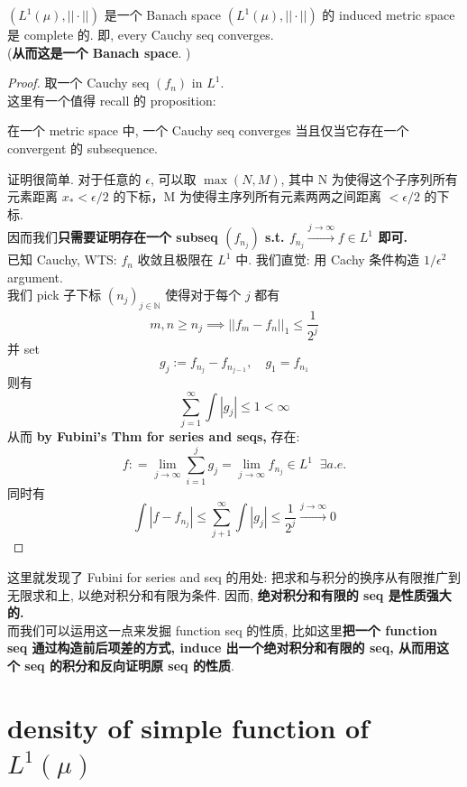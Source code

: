 \documentclass[lang=cn,11pt]{elegantbook}
\begin{document}
\begin{corollary}{$(L^1(\mu), ||\cdot||)$ 是一个 Banach space}
    $(L^1(\mu), ||\cdot||)$ 的 induced metric space 是 complete 的. 即, every Cauchy seq converges.\\
    (\textbf{从而这是一个 Banach space}. )
\end{corollary}
\begin{proof}
    取一个 Cauchy seq $(f_n) $ in $L^1$.\\
这里有一个值得 recall 的 proposition: \begin{proposition}
在一个 metric space 中, 一个 Cauchy seq converges 当且仅当它存在一个 convergent 的 subsequence.
\end{proposition}
证明很简单. 对于任意的 $\epsilon$, 可以取 $\max(N,M)$, 其中 N 为使得这个子序列所有元素距离 $x_* < \epsilon / 2$ 的下标，M 为使得主序列所有元素两两之间距离 $< \epsilon / 2$ 的下标. \\
因而我们\textbf{只需要证明存在一个 subseq $(f_{n_j}) $ s.t. $f_{n_j} \overset{j\to \infty}{\longrightarrow} f \in L^1$ 即可.}\\
已知 Cauchy, WTS: $f_n$ 收敛且极限在 $L^1$ 中. 我们直觉: 用 Cachy 条件构造 $1/\epsilon^2$ argument. \\
我们 pick 子下标 $(n_j)_{j\in \mathbb{N}}$ 使得对于每个 $j$ 都有 \[
m,n \geq n_j \implies       ||f_m - f_n||_1 \leq \frac{1}{2^j}
\]
并 set \[
g_j := f_{n_j} - f_{n_{j-1}}, \quad g_1 = f_{n_1}
\]则有 \[
\sum_{j=1}^\infty \int |g_j| \leq 1 < \infty
\]
从而 \textbf{by Fubini's Thm for series and seqs,} 存在: 
\[
f: = \lim_{j \to \infty} \sum_{i=1}^j g_j = \lim_{j \to \infty} f_{n_j}  \in L^1 \;\; \exists a.e.
\]
同时有 \[
\int |f - f_{n_j} | \leq \sum_{j+1}^\infty  \int |g_j|  \leq \frac{1}{2^j} \overset{j\to \infty}{\longrightarrow} 0
\]
\end{proof}
\begin{remark}
这里就发现了 Fubini for series and seq 的用处: 把求和与积分的换序从有限推广到无限求和上, 以绝对积分和有限为条件. 因而, \textbf{绝对积分和有限的 seq 是性质强大的. }\\
而我们可以运用这一点来发掘 function seq 的性质, 比如这里\textbf{把一个 function seq 通过构造前后项差的方式, induce 出一个绝对积分和有限的 seq, 从而用这个 seq 的积分和反向证明原 seq 的性质}.
\end{remark}



\section{density of simple function of $L^1(\mu)$}
\end{document}
